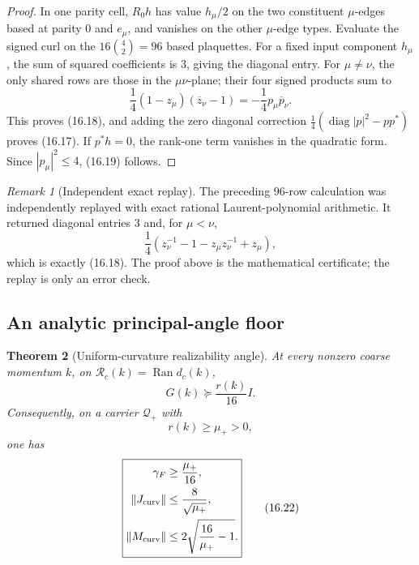 \documentclass[11pt,oneside]{book}
\newtheorem{theorem}{Theorem}[chapter]
\theoremstyle{definition}
\theoremstyle{remark}
\newtheorem{remark}[theorem]{Remark}
\begin{document}
\begin{proof}
In one parity cell, \(R_0h\) has value \(h_\mu/2\) on the two
constituent \(\mu\)-edges based at parity \(0\) and \(e_\mu\), and
vanishes on the other \(\mu\)-edge types.  Evaluate the signed curl on
the \(16\binom42=96\) based plaquettes.  For a fixed input component
\(h_\mu\), the sum of squared coefficients is \(3\), giving the
diagonal entry.  For \(\mu\ne\nu\), the only shared rows are those in
the \(\mu\nu\)-plane; their four signed products sum to
\[
 \frac14(1-z_\mu)(\overline z_\nu-1)
 =-\frac14p_\mu\overline p_\nu.
\]
This proves (16.18), and adding the zero diagonal correction
\(\frac14(\operatorname{diag}|p|^2-pp^*)\) proves (16.17).
If \(p^*h=0\), the rank-one term vanishes in the quadratic form.
Since \(|p_\mu|^2\leq4\), (16.19) follows.
\end{proof}

\begin{remark}[Independent exact replay]
\label{rem:e8v16-replay}
The preceding \(96\)-row calculation was independently replayed with
exact rational Laurent-polynomial arithmetic.  It returned diagonal
entries \(3\) and, for \(\mu<\nu\),
\[
\frac14(z_\nu^{-1}-1-z_\mu z_\nu^{-1}+z_\mu),
\]
which is exactly (16.18).  The proof above is the mathematical
certificate; the replay is only an error check.
\end{remark}

\subsection{An analytic principal-angle floor}

\begin{theorem}[Uniform-curvature realizability angle]
\label{thm:e8v16-angle-floor}
At every nonzero coarse momentum \(k\), on
\(\mathcal R_c(k)=\operatorname{Ran}d_c(k)\),
\[
\boxed{\qquad
             G(k)\succeq\frac{r(k)}{16}I.
\qquad}                                                           \tag{16.20}
\]
Consequently, on a carrier \(\mathcal Q_+\) with
\[
                         r(k)\geq\mu_+>0,                           \tag{16.21}
\]
one has
\[
\boxed{
\begin{aligned}
\gamma_F&\geq\frac{\mu_+}{16},\\
\|J_{\rm curv}\|&\leq\frac8{\sqrt{\mu_+}},\\
\|M_{\rm curv}\|&\leq
       2\sqrt{\frac{16}{\mu_+}-1}.
\end{aligned}}                                                     \tag{16.22}
\]
\end{theorem}
\end{document}
